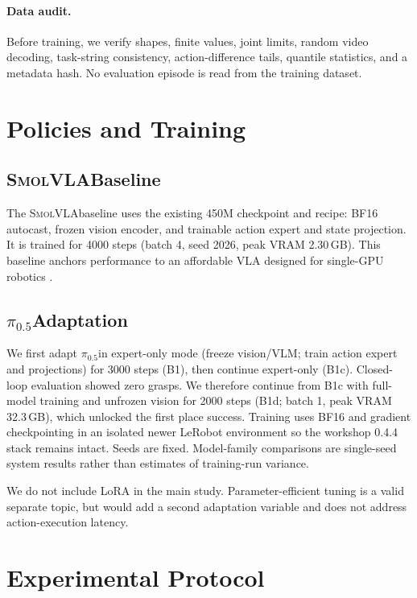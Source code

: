 \documentclass[10pt,twocolumn]{article}
\newcommand{\pifive}{$\pi_{0.5}$}
\newcommand{\smolvla}{\textsc{SmolVLA}}
\begin{document}
\paragraph{Data audit.}
Before training, we verify shapes, finite values, joint limits, random video
decoding, task-string consistency, action-difference tails, quantile
statistics, and a metadata hash.  No evaluation episode is read from the
training dataset.

\section{Policies and Training}

\subsection{\smolvla Baseline}

The \smolvla baseline uses the existing 450M checkpoint and recipe: BF16
autocast, frozen vision encoder, and trainable action expert and state
projection.  It is trained for 4000 steps (batch 4, seed 2026, peak VRAM
2.30\,GB).  This baseline anchors performance to an affordable VLA designed
for single-GPU robotics \cite{shukor2025smolvla}.

\subsection{\pifive Adaptation}

We first adapt \pifive in expert-only mode (freeze vision/VLM; train action
expert and projections) for 3000 steps (B1), then continue expert-only (B1c).
Closed-loop evaluation showed zero grasps.  We therefore continue from B1c
with full-model training and unfrozen vision for 2000 steps (B1d; batch 1,
peak VRAM 32.3\,GB), which unlocked the first place success.  Training uses
BF16 and gradient checkpointing in an isolated newer LeRobot environment so
the workshop 0.4.4 stack remains intact.  Seeds are fixed.  Model-family
comparisons are single-seed system results rather than estimates of
training-run variance.

We do not include LoRA in the main study.  Parameter-efficient tuning is a
valid separate topic, but would add a second adaptation variable and does not
address action-execution latency.

\section{Experimental Protocol}
\end{document}
